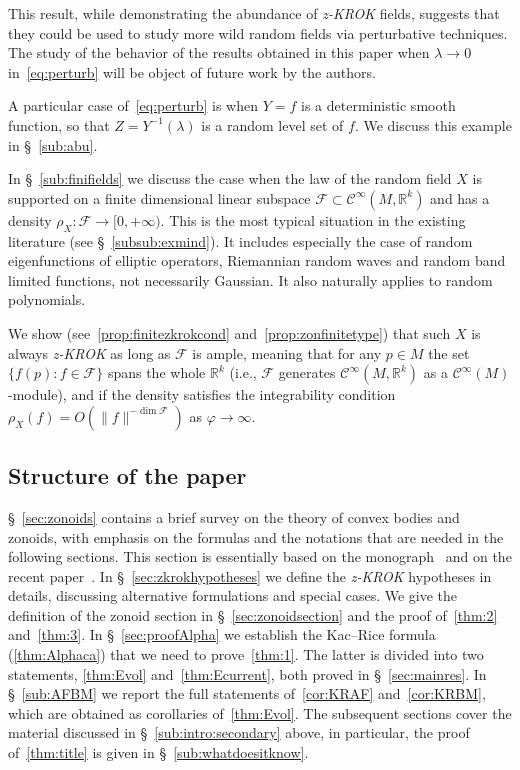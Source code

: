 \documentclass[10pt]{amsart}
\theoremstyle{definition}\newtheorem{defi}[theo]{Definition}\newtheorem{rema}[theo]{Remark}\newtheorem{exam}[theo]{Example}\newtheorem{exem}[theo]{Example}\newtheorem{nota}[theo]{Notation}
\newcommand{\R}{\mathbb{R}}
\newcommand{\F}{\mathcal{F}}
\newcommand{\mC}{\mathcal{C}}
\newcommand{\zkrok}{\emph{z-KROK}\xspace}
\newcommand{\f}{\varphi}
\begin{document}
This result, while demonstrating the abundance of {\zkrok} fields, suggests that they could be used to study more wild random fields via perturbative techniques. The study of the behavior of the results obtained in this paper when $\lambda\to 0$ in~\eqref{eq:perturb} will be object of future work by the authors.

A particular case of~\eqref{eq:perturb} is when $Y=f$ is a deterministic smooth function, so that $Z=Y^{-1}(\lambda)$ is a random level set of $f$. We discuss this example in \S~\ref{sub:abu}.

In \S~\ref{sub:finifields} we discuss the case when the law of the random field $X$ is supported on a finite dimensional linear subspace $\F\subset \mC^\infty(M,\R^k)$ and has a density $\rho_X\colon \F\to [0,+\infty)$. This is the most typical situation in the existing literature (see \S~\ref{subsub:exmind}). It includes especially the case of random eigenfunctions of elliptic operators, Riemannian random waves and random band limited functions, not necessarily Gaussian. It also naturally applies to random polynomials.

We show (see~\cref{prop:finitezkrokcond} and~\cref{prop:zonfinitetype}) that such $X$ is always {\zkrok} as long as $\F$ is ample, meaning that for any $p\in M$ the set $\{f(p)\colon f\in\F\}$ spans the whole $\R^k$ (i.e., $\F$ generates $\mC^\infty(M,\R^k)$ as a $\mC^\infty(M)$-module), and if the density satisfies the integrability condition $\rho_X(f)=O(\|f\|^{-\dim \F})$ as $\f\to\infty$.


\subsection{Structure of the paper}

\S~\ref{sec:zonoids} contains a brief survey on the theory of convex bodies and zonoids, with emphasis on the formulas and the notations that are needed in the following sections. This section is essentially based on the monograph~\cite{bible} and on the recent paper~\cite{ZA}. In \S~\ref{sec:zkrokhypotheses} we define the {\zkrok} hypotheses in details, discussing alternative formulations and special cases. We give the definition of the zonoid section in \S~\ref{sec:zonoidsection} and the proof of~\cref{thm:2} and~\cref{thm:3}. In \S~\ref{sec:proofAlpha} we establish the Kac--Rice formula (\cref{thm:Alphaca}) that we need to prove~\cref{thm:1}. The latter is divided into two statements, \cref{thm:Evol} and~\cref{thm:Ecurrent}, both proved in \S~\ref{sec:mainres}. In \S~\ref{sub:AFBM} we report the full statements of~\cref{cor:KRAF} and~\cref{cor:KRBM}, which are obtained as corollaries of~\cref{thm:Evol}. The subsequent sections cover the material discussed in \S~\ref{sub:intro:secondary} above, in particular, the proof of~\cref{thm:title} is given in \S~\ref{sub:whatdoesitknow}.
\end{document}
